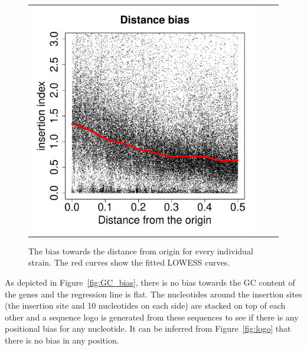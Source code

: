 \documentclass[a4paper,10pt, twocolumn]{article}
\begin{document}
\begin{figure}
\begin{tabular}{c c c}
\includegraphics[page=14, scale=0.22]{biases.pdf} &
\\
\end{tabular}
\caption{The bias towards the distance from origin for every individual strain. The red curves show the fitted LOWESS curves.}
\label{fig:distance_bias_individual}
\end{figure}

As depicted in Figure~\ref{fig:GC_bias}, there is no bias towards the GC content of the genes and the regression line is flat. The nucleotides around the insertion sites (the insertion site and 10 nucleotides on each side) are stacked on top of each other and a sequence logo is generated from these sequences to see if there is any positional bias for any nucleotide. It can be inferred from Figure~\ref{fig:logo} that there is no bias in any position. 
\end{document}
